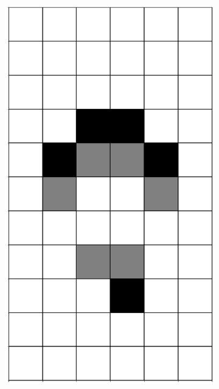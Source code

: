 \documentclass[12pt]{article}
\numberwithin{figure}{section} %
\begin{document}
\begin{figure}[H]
\begin{subfigure}{0.19\textwidth}
     		\includegraphics[width=\linewidth]{Section4/2.2}
   	\end{subfigure}
        \begin{subfigure}{0.19\textwidth}
     		\centering

\end{subfigure}
\end{figure}
\end{document}
